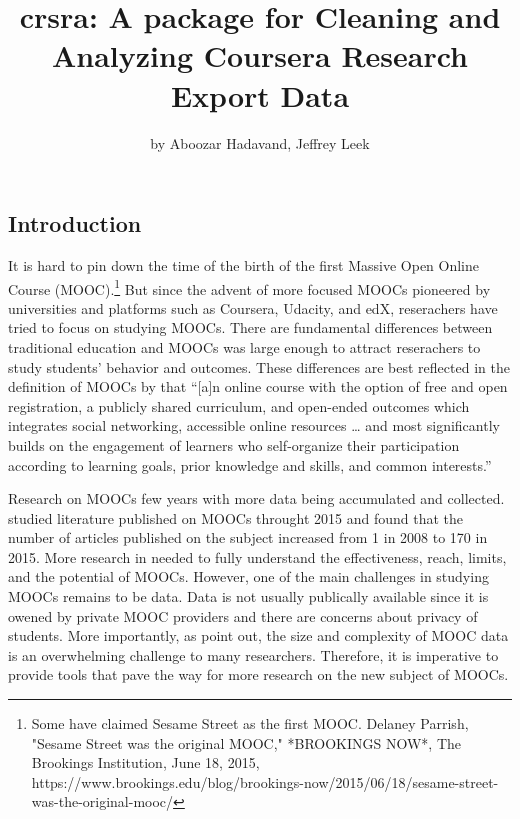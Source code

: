 \title{crsra: A package for Cleaning and Analyzing Coursera Research Export
Data}
\author{by Aboozar Hadavand, Jeffrey Leek}

\maketitle


\subsection{Introduction}\label{introduction}

It is hard to pin down the time of the birth of the first Massive Open
Online Course
(MOOC).\footnote{Some have claimed Sesame Street as the first MOOC. Delaney Parrish, "Sesame Street was the original MOOC," *BROOKINGS NOW*, The Brookings Institution, June 18, 2015, https://www.brookings.edu/blog/brookings-now/2015/06/18/sesame-street-was-the-original-mooc/}
But since the advent of more focused MOOCs pioneered by universities and
platforms such as Coursera, Udacity, and edX, reserachers have tried to
focus on studying MOOCs. There are fundamental differences between
traditional education and MOOCs was large enough to attract reserachers
to study students' behavior and outcomes. These differences are best
reflected in the definition of MOOCs by \cite{mcauley2010mooc} that
``{[}a{]}n online course with the option of free and open registration,
a publicly shared curriculum, and open-ended outcomes which integrates
social networking, accessible online resources \ldots{} and most
significantly builds on the engagement of learners who self-organize
their participation according to learning goals, prior knowledge and
skills, and common interests.''

Research on MOOCs few years with more data being accumulated and
collected. \cite{bozkurt2017trends} studied literature published on
MOOCs throught 2015 and found that the number of articles published on
the subject increased from 1 in 2008 to 170 in 2015. More research in
needed to fully understand the effectiveness, reach, limits, and the
potential of MOOCs. However, one of the main challenges in studying
MOOCs remains to be data. Data is not usually publically available since
it is owened by private MOOC providers and there are concerns about
privacy of students. More importantly, as \cite{lopez2017google} point
out, the size and complexity of MOOC data is an overwhelming challenge
to many researchers. Therefore, it is imperative to provide tools that
pave the way for more research on the new subject of MOOCs.

